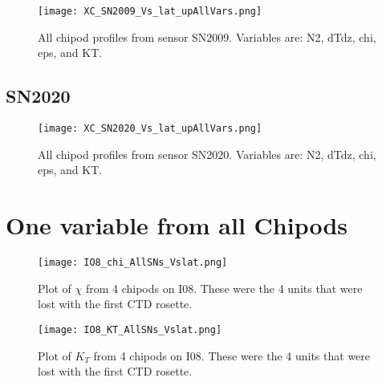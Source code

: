 \documentclass[11pt]{article}
\begin{document}
\begin{figure}[htbp]
\texttt{[image: XC\_SN2009\_Vs\_lat\_upAllVars.png]}
\caption{All chipod profiles from sensor SN2009. Variables are: N2, dTdz, chi, eps, and KT.}
\label{}
\end{figure}

\subsection{SN2020}

\begin{figure}[htbp]
\texttt{[image: XC\_SN2020\_Vs\_lat\_upAllVars.png]}
\caption{All chipod profiles from sensor SN2020. Variables are: N2, dTdz, chi, eps, and KT.}
\label{}
\end{figure}



\clearpage
\newpage
\section{One variable from all Chipods}

\clearpage

\begin{figure}[htbp]
\texttt{[image: IO8\_chi\_AllSNs\_Vslat.png]}
\caption{Plot of $\chi$ from 4 chipods on I08. These were the 4 units that were lost with the first CTD rosette.}
\label{}
\end{figure}


\begin{figure}[htbp]
\texttt{[image: IO8\_KT\_AllSNs\_Vslat.png]}
\caption{Plot of $K_T$ from 4 chipods on I08. These were the 4 units that were lost with the first CTD rosette.}
\label{}
\end{figure}
\end{document}
